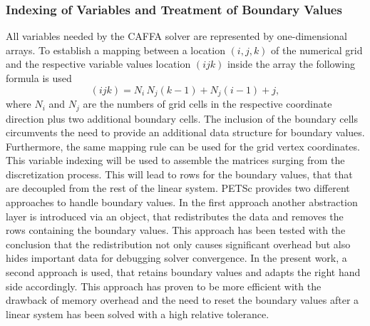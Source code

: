 \subsubsection{Indexing of Variables and Treatment of Boundary Values}

All variables needed by the CAFFA solver are represented by one-dimensional arrays. To establish a mapping between a location \((i,j,k)\) of the numerical grid and the respective variable values location \((ijk)\) inside the array the following formula is used
\begin{displaymath}
  (ijk) = N_i \, N_j \left(k - 1\right) + N_j \left(i - 1\right) + j,
\end{displaymath}
where \(N_i\) and \(N_j\) are the numbers of grid cells in the respective coordinate direction plus two additional boundary cells. The inclusion of the boundary cells circumvents the need to provide an additional data structure for boundary values. Furthermore, the same mapping rule can be used for the grid vertex coordinates. This variable indexing will be used to assemble the matrices surging from the discretization process. This will lead to rows for the boundary values, that that are decoupled from the rest of the linear system. PETSc provides two different approaches to handle boundary values. In the first approach another abstraction layer is introduced via an object, that redistributes the data and removes the rows containing the boundary values. This approach has been tested with the conclusion that the redistribution not only causes significant overhead but also hides important data for debugging solver convergence. In the present work, a second approach is used, that retains boundary values and adapts the right hand side accordingly. This approach has proven to be more efficient with the drawback of memory overhead and the need to reset the boundary values after a linear system has been solved with a high relative tolerance.

